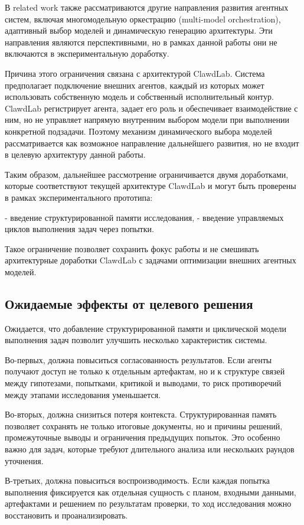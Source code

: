 В related work также рассматриваются другие направления развития агентных систем, включая многомодельную оркестрацию (multi-model orchestration), адаптивный выбор моделей и динамическую генерацию архитектуры. Эти направления являются перспективными, но в рамках данной работы они не включаются в экспериментальную доработку.

Причина этого ограничения связана с архитектурой ClawdLab. Система предполагает подключение внешних агентов, каждый из которых может использовать собственную модель и собственный исполнительный контур. ClawdLab регистрирует агента, задает его роль и обеспечивает взаимодействие с ним, но не управляет напрямую внутренним выбором модели при выполнении конкретной подзадачи. Поэтому механизм динамического выбора моделей рассматривается как возможное направление дальнейшего развития, но не входит в целевую архитектуру данной работы.

Таким образом, дальнейшее рассмотрение ограничивается двумя доработками, которые соответствуют текущей архитектуре ClawdLab и могут быть проверены в рамках экспериментального прототипа:

- введение структурированной памяти исследования,
- введение управляемых циклов выполнения задач через попытки.

Такое ограничение позволяет сохранить фокус работы и не смешивать архитектурные доработки ClawdLab с задачами оптимизации внешних агентных моделей.

\subsection{Ожидаемые эффекты от целевого решения}

Ожидается, что добавление структурированной памяти и циклической модели выполнения задач позволит улучшить несколько характеристик системы.

Во-первых, должна повыситься согласованность результатов. Если агенты получают доступ не только к отдельным артефактам, но и к структуре связей между гипотезами, попытками, критикой и выводами, то риск противоречий между этапами исследования уменьшается.

Во-вторых, должна снизиться потеря контекста. Структурированная память позволяет сохранять не только итоговые документы, но и причины решений, промежуточные выводы и ограничения предыдущих попыток. Это особенно важно для задач, которые требуют длительного анализа или нескольких раундов уточнения.

В-третьих, должна повыситься воспроизводимость. Если каждая попытка выполнения фиксируется как отдельная сущность с планом, входными данными, артефактами и решением по результатам проверки, то ход исследования можно восстановить и проанализировать.

